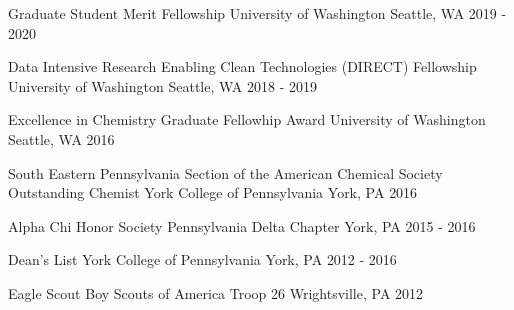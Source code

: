 



\begin{cvhonors}

  \cvhonor
    {Graduate Student Merit Fellowship} %
    {University of Washington} %
    {Seattle, WA} %
    {2019 - 2020} %

  \cvhonor
    {Data Intensive Research Enabling Clean Technologies (DIRECT) Fellowship} %
    {University of Washington} %
    {Seattle, WA} %
    {2018 - 2019} %


  \cvhonor
    {Excellence in Chemistry Graduate Fellowhip Award} %
    {University of Washington} %
    {Seattle, WA} %
    {2016} %


  \cvhonor
    {South Eastern Pennsylvania Section of the American Chemical Society Outstanding Chemist} %
    {York College of Pennsylvania} %
    {York, PA} %
    {2016} %


  \cvhonor
    {Alpha Chi Honor Society} %
    {Pennsylvania Delta Chapter} %
    {York, PA} %
    {2015 - 2016} %


  \cvhonor
    {Dean's List} %
    {York College of Pennsylvania} %
    {York, PA} %
    {2012 - 2016} %


  \cvhonor
    {Eagle Scout} %
    {Boy Scouts of America Troop 26} %
    {Wrightsville, PA} %
    {2012} %

\end{cvhonors}

